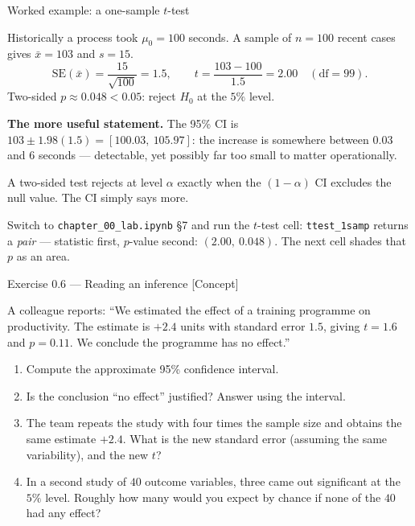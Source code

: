 \documentclass[aspectratio=169,11pt]{beamer}
\begin{document}
\begin{frame}{Worked example: a one-sample $t$-test}
  \footnotesize
  \begin{numexample}
    Historically a process took $\mu_0 = 100$ seconds. A sample of $n = 100$
    recent cases gives $\bar x = 103$ and $s = 15$.
    \[
      \mathrm{SE}(\bar x) = \frac{15}{\sqrt{100}} = 1.5,
      \qquad
      t = \frac{103 - 100}{1.5} = 2.00 \quad (\text{df} = 99).
    \]
    Two-sided $p \approx 0.048 < 0.05$: reject $H_0$ at the $5\%$ level.

    \textbf{The more useful statement.} The 95\% CI is
    $103 \pm 1.98(1.5) = [100.03,\ 105.97]$: the increase is somewhere
    between $0.03$ and $6$ seconds --- detectable, yet possibly far too small
    to matter operationally.
  \end{numexample}
  \begin{takeaway}
    A two-sided test rejects at level $\alpha$ exactly when the
    $(1-\alpha)$ CI excludes the null value. The CI simply says more.
  \end{takeaway}
  \begin{labnote}
    Switch to \texttt{chapter\_00\_lab.ipynb} \S7 and run the $t$-test cell:
    \texttt{ttest\_1samp} returns a \emph{pair} --- statistic first,
    $p$-value second: $(2.00,\ 0.048)$. The next cell shades that $p$ as an area.
  \end{labnote}
\end{frame}

\begin{frame}{Exercise 0.6 --- Reading an inference [Concept]}
  \begin{exercise}
    A colleague reports: ``We estimated the effect of a training programme on
    productivity. The estimate is $+2.4$ units with standard error $1.5$,
    giving $t = 1.6$ and $p = 0.11$. We conclude the programme has no
    effect.''
    \begin{enumerate}
      \item Compute the approximate 95\% confidence interval.
      \item Is the conclusion ``no effect'' justified? Answer using the
            interval.
      \item The team repeats the study with four times the sample size and
            obtains the same estimate $+2.4$. What is the new standard error
            (assuming the same variability), and the new $t$?
      \item In a second study of $40$ outcome variables, three came out
            significant at the $5\%$ level. Roughly how many would you expect
            by chance if none of the $40$ had any effect?
    \end{enumerate}
  \end{exercise}
\end{frame}
\end{document}

